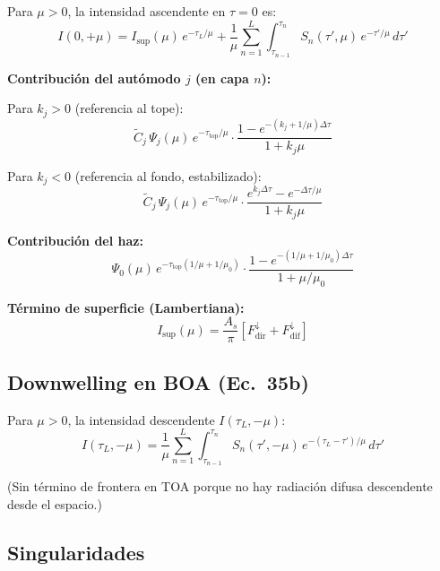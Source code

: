\documentclass[a4paper,11pt]{article}
\begin{document}
Para $\mu > 0$, la intensidad ascendente en $\tau = 0$ es:
\begin{equation}
I(0, +\mu) = I_{\text{sup}}(\mu) \, e^{-\tau_L/\mu} + \frac{1}{\mu} \sum_{n=1}^{L} \int_{\tau_{n-1}}^{\tau_n} S_n(\tau', \mu) \, e^{-\tau'/\mu} \, d\tau'
\label{eq:35a}
\end{equation}

\textbf{Contribuci\'on del autómodo $j$ (en capa $n$):}

Para $k_j > 0$ (referencia al tope):
\begin{equation}
\widetilde{C}_j \, \Psi_j(\mu) \, e^{-\tau_{\text{top}}/\mu} \cdot \frac{1 - e^{-(k_j + 1/\mu)\Delta\tau}}{1 + k_j \mu}
\end{equation}

Para $k_j < 0$ (referencia al fondo, estabilizado):
\begin{equation}
\widetilde{C}_j \, \Psi_j(\mu) \, e^{-\tau_{\text{top}}/\mu} \cdot \frac{e^{k_j \Delta\tau} - e^{-\Delta\tau/\mu}}{1 + k_j \mu}
\end{equation}

\textbf{Contribuci\'on del haz:}
\begin{equation}
\Psi_0(\mu) \, e^{-\tau_{\text{top}}(1/\mu + 1/\mu_0)} \cdot \frac{1 - e^{-(1/\mu + 1/\mu_0)\Delta\tau}}{1 + \mu/\mu_0}
\end{equation}

\textbf{T\'ermino de superficie (Lambertiana):}
\begin{equation}
I_{\text{sup}}(\mu) = \frac{A_s}{\pi} \left[ F_{\text{dir}}^{\downarrow} + F_{\text{dif}}^{\downarrow} \right]
\end{equation}

\subsection{Downwelling en BOA (Ec.~35b)}

Para $\mu > 0$, la intensidad descendente $I(\tau_L, -\mu)$:
\begin{equation}
I(\tau_L, -\mu) = \frac{1}{\mu} \sum_{n=1}^{L} \int_{\tau_{n-1}}^{\tau_n} S_n(\tau', -\mu) \, e^{-(\tau_L - \tau')/\mu} \, d\tau'
\label{eq:35b}
\end{equation}

(Sin t\'ermino de frontera en TOA porque no hay radiaci\'on difusa descendente desde el espacio.)

\subsection{Singularidades}
\end{document}
